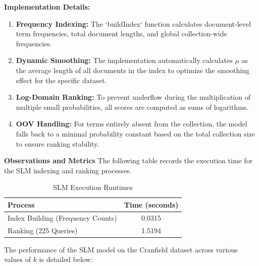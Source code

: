\documentclass{article}
\begin{document}
\textbf{Implementation Details:}
\begin{enumerate}
    \item \textbf{Frequency Indexing:} The `buildIndex` function calculates document-level term frequencies, total document lengths, and global collection-wide frequencies.
    \item \textbf{Dynamic Smoothing:} The implementation automatically calculates $\mu$ as the average length of all documents in the index to optimize the smoothing effect for the specific dataset.
    \item \textbf{Log-Domain Ranking:} To prevent underflow during the multiplication of multiple small probabilities, all scores are computed as sums of logarithms.
    \item \textbf{OOV Handling:} For terms entirely absent from the collection, the model falls back to a minimal probability constant based on the total collection size to ensure ranking stability.
\end{enumerate}

\textbf{Observations and Metrics}
The following table records the execution time for the SLM indexing and ranking processes.

\begin{table}[H]
\centering
\begin{tabular}{|l|c|}
\hline
\textbf{Process} & \textbf{Time (seconds)} \\ \hline
Index Building (Frequency Counts) & 0.0315 \\ \hline
Ranking (225 Queries) & 1.5194 \\ \hline
\end{tabular}
\caption{SLM Execution Runtimes}
\end{table}

The performance of the SLM model on the Cranfield dataset across various values of $k$ is detailed below:
\end{document}
